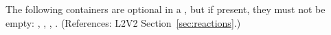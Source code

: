 The following containers are optional in a \Reaction, but if
present, they must not be empty: ,
, ,
.  (References: L2V2
Section~\ref{sec:reactions}.)

